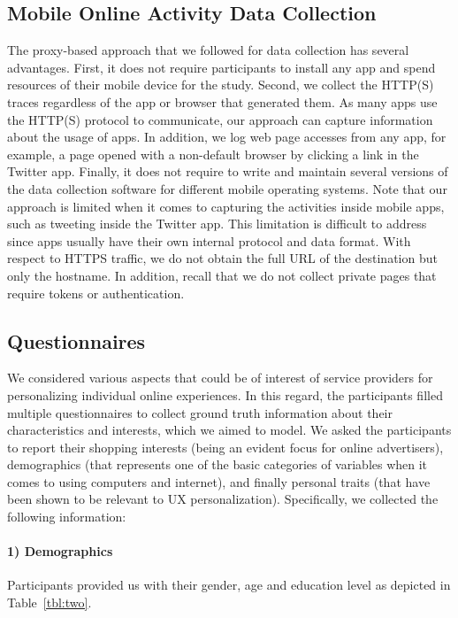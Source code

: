 \subsection{Mobile Online Activity Data Collection}
The proxy-based approach that we followed for data collection has several advantages. First, it does not require participants to install any app and spend resources of their mobile device for the study. Second, we collect the HTTP(S) traces regardless of the app or browser that generated them. As many apps use the HTTP(S) protocol to communicate, our approach can capture information about the usage of apps. In addition, we log web page accesses from any app, for example, a page opened with a non-default browser by clicking a link in the Twitter app. Finally, it does not require to write and maintain several versions of the data collection software for different mobile operating systems. Note that our approach is limited when it comes to capturing the activities inside mobile apps, such as tweeting inside the Twitter app. This limitation is difficult to address since apps usually have their own internal protocol and data format. With respect to HTTPS traffic, we do not obtain the full URL of the destination but only the hostname. In addition, recall that we do not collect private pages that require tokens or authentication. 

\subsection{Questionnaires}
We considered various aspects that could be of interest of service providers for personalizing individual online experiences. In this regard, the participants filled multiple questionnaires to collect ground truth information about their characteristics and interests, which we aimed to model. We asked the participants to report their shopping interests (being an evident focus for online advertisers), demographics (that represents one of the basic categories of variables when it comes to using computers and internet), and finally personal traits (that have been shown to be relevant to UX personalization). Specifically, we collected the following information: 
\paragraph{\textbf{1) Demographics}} Participants provided us with their gender, age and education level as depicted in Table~\ref{tbl:two}.

